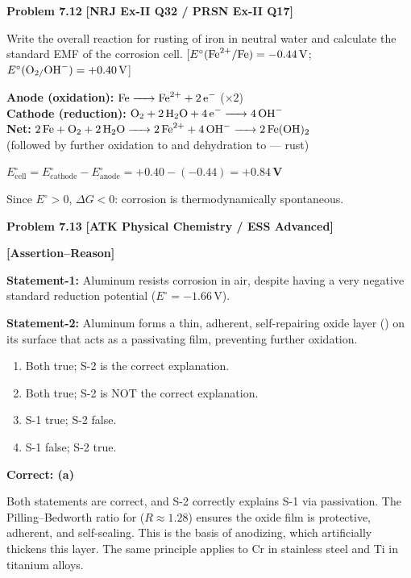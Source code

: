 \begin{problembox}
\textbf{Problem 7.12} \hfill \textbf{[NRJ Ex-II Q32 / PRSN Ex-II Q17]}

Write the overall reaction for rusting of iron in neutral water and calculate the standard EMF of the corrosion cell. [$E^\circ(\ce{Fe^2+/Fe}) = -0.44\,\text{V}$; $E^\circ(\ce{O2/OH-}) = +0.40\,\text{V}$]
\end{problembox}
\begin{solution}
\textbf{Anode (oxidation):} $\ce{Fe -> Fe^2+ + 2e-}$ ($\times2$)\\
\textbf{Cathode (reduction):} $\ce{O2 + 2H2O + 4e- -> 4OH-}$\\
\textbf{Net:} $\ce{2Fe + O2 + 2H2O -> 2Fe^2+ + 4OH- -> 2Fe(OH)2}$\\
(followed by further oxidation to  and dehydration to  --- rust)

$E^\circ_{\text{cell}} = E^\circ_{\text{cathode}} - E^\circ_{\text{anode}} = +0.40 - (-0.44) = \mathbf{+0.84\,\text{V}}$

Since $E^\circ > 0$, $\Delta G < 0$: corrosion is thermodynamically spontaneous.
\end{solution}

\begin{problembox}
\textbf{Problem 7.13} \hfill \textbf{[ATK Physical Chemistry / ESS Advanced]}

\textbf{[Assertion--Reason]}

\textbf{Statement-1:} Aluminum resists corrosion in air, despite having a very negative standard reduction potential ($E^\circ = -1.66\,\text{V}$).

\textbf{Statement-2:} Aluminum forms a thin, adherent, self-repairing oxide layer () on its surface that acts as a passivating film, preventing further oxidation.

\begin{enumerate}[label=(\alph*)]
    \item Both true; S-2 is the correct explanation.
    \item Both true; S-2 is NOT the correct explanation.
    \item S-1 true; S-2 false.
    \item S-1 false; S-2 true.
\end{enumerate}
\end{problembox}
\begin{solution}
\textbf{Correct: (a)}

Both statements are correct, and S-2 correctly explains S-1 via passivation. The Pilling--Bedworth ratio for  ($R \approx 1.28$) ensures the oxide film is protective, adherent, and self-sealing. This is the basis of anodizing, which artificially thickens this layer. The same principle applies to Cr in stainless steel and Ti in titanium alloys.
\end{solution}

